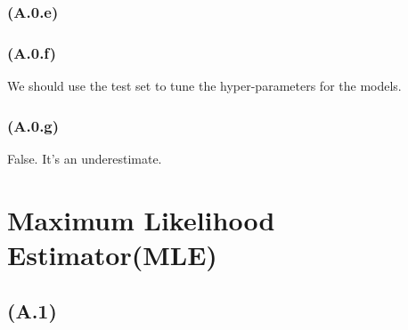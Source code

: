 \documentclass[]{article}
\begin{document}
        \subsubsection*{(A.0.e)}

        \subsubsection*{(A.0.f)}
            \hspace{1.1em}
            We should use the test set to tune the hyper-parameters for the models. 
        \subsubsection*{(A.0.g)}
            \hspace{1.1em}
            False. It's an underestimate. 

\section*{Maximum Likelihood Estimator(MLE)}
    \subsection*{(A.1)}
\end{document}
